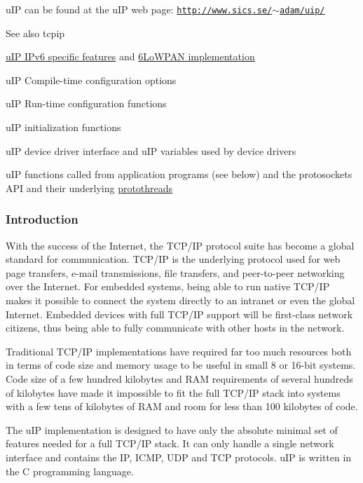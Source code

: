 u\-I\-P can be found at the u\-I\-P web page\-: \href{http://www.sics.se/~adam/uip/}{\tt http\-://www.\-sics.\-se/$\sim$adam/uip/}

\begin{DoxySeeAlso}{\-See also}
tcpip 

\hyperlink{a00061}{u\-I\-P \-I\-Pv6 specific features} and \hyperlink{a00056}{6\-Lo\-W\-P\-A\-N implementation} 

u\-I\-P \-Compile-\/time configuration options 

u\-I\-P \-Run-\/time configuration functions 

u\-I\-P initialization functions 

u\-I\-P device driver interface and u\-I\-P variables used by device drivers 

u\-I\-P functions called from application programs (see below) and the protosockets \-A\-P\-I and their underlying \hyperlink{a00052}{protothreads}
\end{DoxySeeAlso}
\hypertarget{a00060_uIPIntroduction}{}\subsubsection{\-Introduction}\label{a00060_uIPIntroduction}
\-With the success of the \-Internet, the \-T\-C\-P/\-I\-P protocol suite has become a global standard for communication. \-T\-C\-P/\-I\-P is the underlying protocol used for web page transfers, e-\/mail transmissions, file transfers, and peer-\/to-\/peer networking over the \-Internet. \-For embedded systems, being able to run native \-T\-C\-P/\-I\-P makes it possible to connect the system directly to an intranet or even the global \-Internet. \-Embedded devices with full \-T\-C\-P/\-I\-P support will be first-\/class network citizens, thus being able to fully communicate with other hosts in the network.

\-Traditional \-T\-C\-P/\-I\-P implementations have required far too much resources both in terms of code size and memory usage to be useful in small 8 or 16-\/bit systems. \-Code size of a few hundred kilobytes and \-R\-A\-M requirements of several hundreds of kilobytes have made it impossible to fit the full \-T\-C\-P/\-I\-P stack into systems with a few tens of kilobytes of \-R\-A\-M and room for less than 100 kilobytes of code.

\-The u\-I\-P implementation is designed to have only the absolute minimal set of features needed for a full \-T\-C\-P/\-I\-P stack. \-It can only handle a single network interface and contains the \-I\-P, \-I\-C\-M\-P, \-U\-D\-P and \-T\-C\-P protocols. u\-I\-P is written in the \-C programming language.

